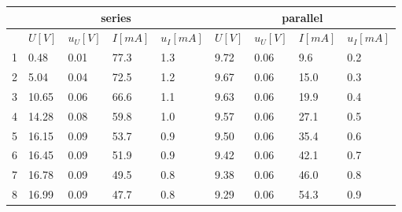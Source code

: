 \documentclass[12pt, a4paper]{article}
\begin{document}
\begin{table}[H]
	\begin{center}
	\begin{tabular}{|l|llll|llll|}
	\hline
	   & \multicolumn{4}{c|}{series}                                                                            & \multicolumn{4}{c|}{parallel}                                                                          \\ \hline
	   & \multicolumn{1}{l|}{$U[V]$} & \multicolumn{1}{l|}{$u_U[V]$} & \multicolumn{1}{l|}{$I[mA]$} & $u_I[mA]$ & \multicolumn{1}{l|}{$U[V]$} & \multicolumn{1}{l|}{$u_U[V]$} & \multicolumn{1}{l|}{$I[mA]$} & $u_I[mA]$ \\ \hline
	1  & \multicolumn{1}{l|}{0.48}   & \multicolumn{1}{l|}{0.01}     & \multicolumn{1}{l|}{77.3}    & 1.3       & \multicolumn{1}{l|}{9.72}   & \multicolumn{1}{l|}{0.06}     & \multicolumn{1}{l|}{9.6}     & 0.2       \\ \hline
	2  & \multicolumn{1}{l|}{5.04}   & \multicolumn{1}{l|}{0.04}     & \multicolumn{1}{l|}{72.5}    & 1.2       & \multicolumn{1}{l|}{9.67}   & \multicolumn{1}{l|}{0.06}     & \multicolumn{1}{l|}{15.0}    & 0.3       \\ \hline
	3  & \multicolumn{1}{l|}{10.65}  & \multicolumn{1}{l|}{0.06}     & \multicolumn{1}{l|}{66.6}    & 1.1       & \multicolumn{1}{l|}{9.63}   & \multicolumn{1}{l|}{0.06}     & \multicolumn{1}{l|}{19.9}    & 0.4       \\ \hline
	4  & \multicolumn{1}{l|}{14.28}  & \multicolumn{1}{l|}{0.08}     & \multicolumn{1}{l|}{59.8}    & 1.0       & \multicolumn{1}{l|}{9.57}   & \multicolumn{1}{l|}{0.06}     & \multicolumn{1}{l|}{27.1}    & 0.5       \\ \hline
	5  & \multicolumn{1}{l|}{16.15}  & \multicolumn{1}{l|}{0.09}     & \multicolumn{1}{l|}{53.7}    & 0.9       & \multicolumn{1}{l|}{9.50}   & \multicolumn{1}{l|}{0.06}     & \multicolumn{1}{l|}{35.4}    & 0.6       \\ \hline
	6  & \multicolumn{1}{l|}{16.45}  & \multicolumn{1}{l|}{0.09}     & \multicolumn{1}{l|}{51.9}    & 0.9       & \multicolumn{1}{l|}{9.42}   & \multicolumn{1}{l|}{0.06}     & \multicolumn{1}{l|}{42.1}    & 0.7       \\ \hline
	7  & \multicolumn{1}{l|}{16.78}  & \multicolumn{1}{l|}{0.09}     & \multicolumn{1}{l|}{49.5}    & 0.8       & \multicolumn{1}{l|}{9.38}   & \multicolumn{1}{l|}{0.06}     & \multicolumn{1}{l|}{46.0}    & 0.8       \\ \hline
	8  & \multicolumn{1}{l|}{16.99}  & \multicolumn{1}{l|}{0.09}     & \multicolumn{1}{l|}{47.7}    & 0.8       & \multicolumn{1}{l|}{9.29}   & \multicolumn{1}{l|}{0.06}     & \multicolumn{1}{l|}{54.3}    & 0.9       \\ \hline

\end{tabular}
\end{center}
\end{table}
\end{document}
